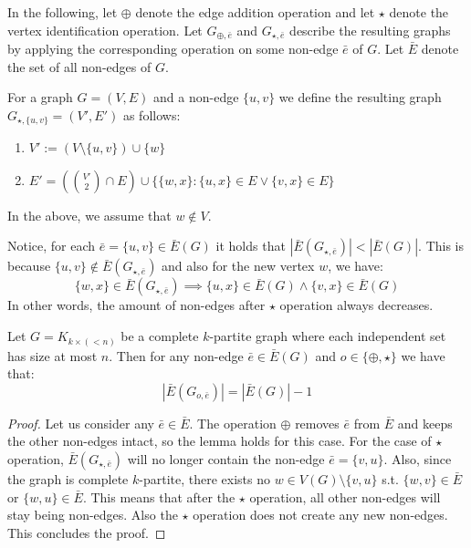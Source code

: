 In the following, let $\oplus$ denote the edge addition operation and let $\star$ denote the vertex identification operation. Let $G_{\oplus,\bar{e}}$ and $G_{\star,\bar{e}}$ describe the resulting graphs by applying the corresponding operation on some non-edge $\bar{e}$ of $G$. Let $\bar{E}$ denote the set of all non-edges of $G$.


\begin{defn}
    For a graph $G=(V,E)$ and a non-edge $\{u,v\}$ we define the resulting graph $G_{\star,\{u,v\}} = (V',E')$ as follows:
    \begin{enumerate}
        \item $V' := (V \setminus \{u,v\}) \cup \{w\}$
        \item $E' = (\binom{V'}{2} \cap E) \cup \{\{w,x\} : \{u,x\} \in E \vee \{v,x\} \in E\}$
    \end{enumerate}
    In the above, we assume that $w \notin V$.
\end{defn}

Notice, for each $\bar{e} = \{u,v\}\in \bar{E}(G)$ it holds that $|\bar{E}(G_{\star,\bar{e}})| < |\bar{E}(G)|$. This is because $\{u,v\} \notin \bar{E}(G_{\star,\bar{e}})$ and also for the new vertex $w$, we have: \[\{w,x\} \in \bar{E}(G_{\star,\bar{e}}) \implies \{u,x\} \in \bar{E}(G) \wedge \{v,x\} \in \bar{E}(G)\]
In other words, the amount of non-edges after $\star$ operation always decreases.

\begin{lemma}
\label{lemma:non-edge_set_size}
    Let $G = K_{k \times (<n)}$ be a complete $k$-partite graph where each independent set has size at most $n$. Then for any non-edge $\bar{e} \in \bar{E}(G)$ and $o \in \{\oplus,\star\}$ we have that: \[|\bar{E}(G_{o,\bar{e}})| = |\bar{E}(G)| - 1\]
\end{lemma}

\begin{proof}
    Let us consider any $\bar{e} \in \bar{E}$. The operation $\oplus$ removes $\bar{e}$ from $\bar{E}$ and keeps the other non-edges intact, so the lemma holds for this case. For the case of $\star$ operation, $\bar{E}(G_{\star,\bar{e}})$ will no longer contain the non-edge $\bar{e}=\{v,u\}$. Also, since the graph is complete $k$-partite, there exists no $w \in V(G) \setminus \{v,u\}$ s.t. $\{w,v\} \in \bar{E}$ or $\{w,u\} \in \bar{E}$. This means that after the $\star$ operation, all other non-edges will stay being non-edges. Also the $\star$ operation does not create any new non-edges. This concludes the proof.
\end{proof}

